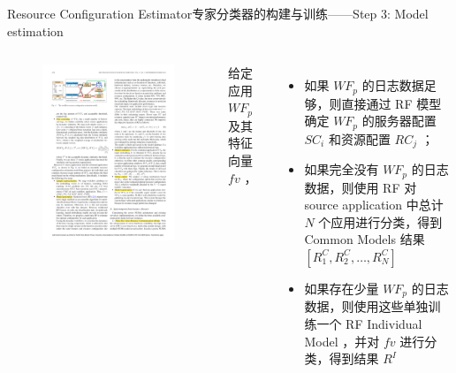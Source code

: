 \documentclass[aspectratio=169]{beamer}
\begin{document}
\begin{frame}{Resource Configuration Estimator}{专家分类器的构建与训练——Step 3: Model estimation}
  \begin{columns}
    \begin{figure}
      \centering
      \includegraphics[width=\textwidth]{img/method/resource-configuration-estimation-model.pdf}
    \end{figure}

    给定应用 $WF_p$ 及其特征向量 $fv$ ，
    \begin{itemize}
      \item<1-> 如果 $WF_p$ 的日志数据足够，则直接通过 RF 模型确定 $WF_p$ 的服务器配置 $SC_i$ 和资源配置 $RC_j$ ；
      \item<2-> 如果完全没有 $WF_p$ 的日志数据，则使用 RF 对 source application 中总计 $N$ 个应用进行分类，得到 Common Models 结果 $[R_1^C, R_2^C, \dots, R_N^C]$
      \item<3-> 如果存在少量 $WF_p$ 的日志数据，则使用这些单独训练一个 RF Individual Model ，并对 $fv$ 进行分类，得到结果 $R^I$
    \end{itemize}
  \end{columns}
\end{frame}
\end{document}
